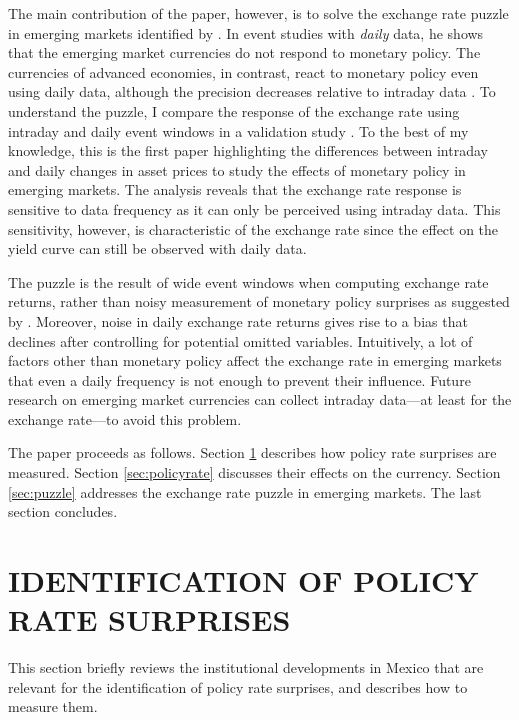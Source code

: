 \documentclass[a4paper,12pt]{article} 		%
\begin{document}
The main contribution of the paper, however, is to solve the exchange rate puzzle in emerging markets identified by \textcite{Kohlscheen:2014}. In event studies with \textit{daily} data, he shows that the emerging market currencies do not respond to monetary policy. The currencies of advanced economies, in contrast, react to monetary policy even using daily data, although the precision decreases relative to intraday data \parencite{Wright:2012, FerrariKearnsSchrimpf:2021}. To understand the puzzle, I compare the response of the exchange rate using intraday and daily event windows in a validation study \parencite{Boundetal:1994}. To the best of my knowledge, this is the first paper highlighting the differences between intraday and daily changes in asset prices to study the effects of monetary policy in emerging markets. The analysis reveals that the exchange rate response is sensitive to data frequency as it can only be perceived using intraday data. This sensitivity, however, is characteristic of the exchange rate since the effect on the yield curve can still be observed with daily data. 

The puzzle is the result of wide event windows when computing exchange rate returns, rather than noisy measurement of monetary policy surprises as suggested by \textcite{PenningsRamayandiTang:2015}. Moreover, noise in daily exchange rate returns gives rise to a bias that declines after controlling for potential omitted variables. Intuitively, a lot of factors other than monetary policy affect the exchange rate in emerging markets that even a daily frequency is not enough to prevent their influence. Future research on emerging market currencies can collect intraday data---at least for the exchange rate---to avoid this problem. 

The paper proceeds as follows. Section \ref{sec:mpsidentification} describes how policy rate surprises are measured. Section \ref{sec:policyrate} discusses their effects on the currency. Section \ref{sec:puzzle} addresses the exchange rate puzzle in emerging markets. The last section concludes.

\sectitlespace
\section{IDENTIFICATION OF POLICY RATE SURPRISES} \label{sec:mpsidentification}
\sectitlespace

This section briefly reviews the institutional developments in Mexico that are relevant for the identification of policy rate surprises, and describes how to measure them. 
\end{document}
